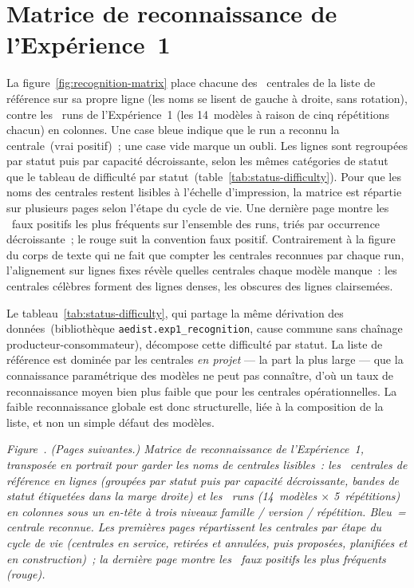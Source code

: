 \documentclass[a4paper,11pt]{report}
\begin{document}
\appendix

\chapter{Matrice de reconnaissance de l'Expérience~1}\label{annex:recognition-matrix}

La figure~\ref{fig:recognition-matrix} place chacune des
\ExpOneMatrixPlants{}~centrales de la liste de référence sur sa propre ligne
(les noms se lisent de gauche à droite, sans rotation), contre les
\ExpOneMatrixRuns{}~runs de l'Expérience~1 (les 14~modèles à raison de cinq
répétitions chacun) en colonnes. Une case bleue indique que le run a reconnu la
centrale~(vrai positif)~; une case vide marque un oubli. Les lignes sont
regroupées par statut puis par capacité décroissante, selon les mêmes
catégories de statut que le tableau de difficulté par
statut~(table~\ref{tab:status-difficulty}). Pour que les noms des centrales
restent lisibles à l'échelle d'impression, la matrice est répartie sur
plusieurs pages selon l'étape du cycle de vie. Une dernière page montre les
\ExpOneMatrixFPs{}~faux positifs les plus fréquents sur l'ensemble des runs,
triés par occurrence décroissante~; le rouge suit la convention faux positif.
Contrairement à la figure du corps de texte qui ne fait que compter les
centrales reconnues par chaque run, l'alignement sur lignes fixes révèle
quelles centrales chaque modèle manque~: les centrales célèbres forment des
lignes denses, les obscures des lignes clairsemées.

Le tableau~\ref{tab:status-difficulty}, qui partage la même dérivation des
données~(bibliothèque \texttt{aedist.exp1\_recognition}, cause commune sans
chaînage producteur-consommateur), décompose cette difficulté par statut. La
liste de référence est dominée par les centrales \emph{en projet} — la part la
plus large — que la connaissance paramétrique des modèles ne peut pas connaître,
d'où un taux de reconnaissance moyen bien plus faible que pour les centrales
opérationnelles. La faible reconnaissance globale est donc structurelle, liée à
la composition de la liste, et non un simple défaut des modèles.

\label{fig:recognition-matrix}
\noindent\emph{Figure~\thefigure. (Pages suivantes.) Matrice de reconnaissance
de l'Expérience~1, transposée en portrait pour garder les noms de centrales
lisibles~: les \ExpOneMatrixPlants{}~centrales de référence en lignes (groupées
par statut puis par capacité décroissante, bandes de statut étiquetées dans la
marge droite) et les \ExpOneMatrixRuns{}~runs (14~modèles $\times$
5~répétitions) en colonnes sous un en-tête à trois niveaux famille / version /
répétition. Bleu~= centrale reconnue. Les premières pages répartissent les
centrales par étape du cycle de vie (centrales en service, retirées et
annulées, puis proposées, planifiées et en construction)~; la dernière page
montre les
\ExpOneMatrixFPs{}~faux positifs les plus fréquents (rouge).}







\end{document}
